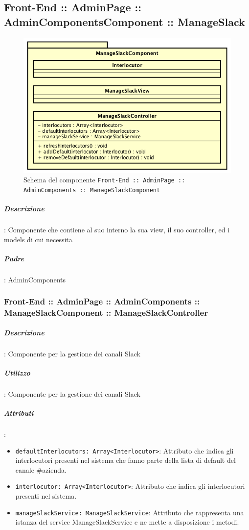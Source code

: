\documentclass[../ManualeSviluppatore_v1.0.0.tex]{subfiles}
\begin{document}
	\subsection{Front-End :: AdminPage :: AdminComponentsComponent :: ManageSlack}
	\begin{figure}[!h]
		\centering
		\includegraphics[scale=0.6]{Architettura/Front-End/AdminPage/AdminComponents/ManageSlackComponent.png}
		\caption{Schema del componente \texttt{Front-End :: AdminPage :: AdminComponents :: ManageSlackComponent}}
	\end{figure}
			\subparagraph{Descrizione}: Componente che contiene al suo interno la sua view, il suo controller, ed i models di cui necessita
			\subparagraph{Padre}: AdminComponents
			      \subsubsection{Front-End :: AdminPage :: AdminComponents :: ManageSlackComponent :: ManageSlackController}
			      	\subparagraph{Descrizione}: Componente per la gestione dei canali Slack
			      	\subparagraph{Utilizzo}: Componente per la gestione dei canali Slack
			      	\subparagraph{Attributi}:
					\begin{itemize}
						\item \texttt{defaultInterlocutors: Array<Interlocutor>}: Attributo che indica gli interlocutori presenti nel sistema che fanno parte della lista di default del canale \#azienda.
						\item \texttt{interlocutor: Array<Interlocutor>}: Attributo che indica gli interlocutori presenti nel sistema.
						\item \texttt{manageSlackService: ManageSlackService}: Attributo che rappresenta una istanza del service ManageSlackService e ne mette a disposizione i metodi.
					\end{itemize}
\end{document}
